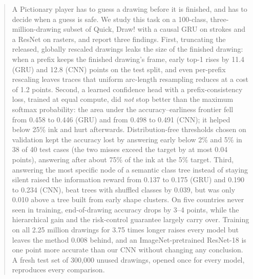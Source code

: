 \begin{abstract}
A Pictionary player has to guess a drawing before it is finished, and has to decide when a
guess is safe. We study this task on a 100-class, three-million-drawing subset of
Quick, Draw! with a causal GRU on strokes and a ResNet on rasters, and report three findings.
First, truncating the released, globally rescaled drawings leaks the size of the finished
drawing: when a prefix keeps the finished drawing's frame, early top-1 rises by 11.4 (GRU) and
12.8 (CNN) points on the test split, and even per-prefix rescaling leaves traces that uniform
arc-length resampling reduces at a cost of 1.2 points. Second, a learned confidence head with
a prefix-consistency loss, trained at equal compute, did \emph{not} stop better than the maximum
softmax probability: the area under the accuracy--earliness frontier fell from 0.458 to 0.446
(GRU) and from 0.498 to 0.491 (CNN); it helped below 25\% ink and hurt afterwards.
Distribution-free thresholds chosen on validation kept the accuracy lost by answering early
below 2\% and 5\% in 38 of 40 test cases (the two misses exceed the target by at most 0.04
points), answering after about 75\% of the ink at the 5\% target. Third, answering the most
specific node of a semantic class tree instead of staying silent raised the information reward
from 0.137 to 0.175 (GRU) and 0.190 to 0.234 (CNN), beat trees with shuffled classes by 0.039,
but was only 0.010 above a tree built from early shape clusters. On five countries never seen
in training, end-of-drawing accuracy drops by 3--4 points, while the hierarchical gain and the
risk-control guarantee largely carry over. Training on all 2.25 million drawings for 3.75 times
longer raises every model but leaves the method 0.008 behind, and an ImageNet-pretrained ResNet-18
is one point more accurate than our CNN without changing any conclusion. A fresh test set of
300{,}000 unused drawings, opened once for every model, reproduces every comparison.
\end{abstract}
